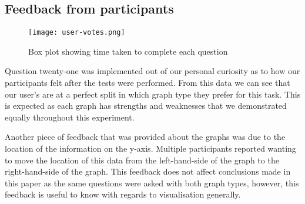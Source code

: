 \subsection*{Feedback from participants}
\begin{figure}[H]
    \centering
    \texttt{[image: user-votes.png]}
    \caption{Box plot showing time taken to complete each question}
\end{figure}
\begin{flushleft}
    Question twenty-one was implemented out of our personal curiosity as to how our participants felt after the tests were performed.
    From this data we can see that our user's are at a perfect split in which graph type they prefer for this task. This is expected as 
    each graph has strengths and weaknesses that we demonstrated equally throughout this experiment.
    
    Another piece of feedback that was provided about the graphs was due to the location of the information on the y-axis. Multiple participants
    reported wanting to move the location of this data from the left-hand-side of the graph to the right-hand-side of the graph. This feedback does not affect
    conclusions made in this paper as the same questions were asked with both graph types, however, this feedback is useful to know with regards to visualisation
    generally.
\end{flushleft}


